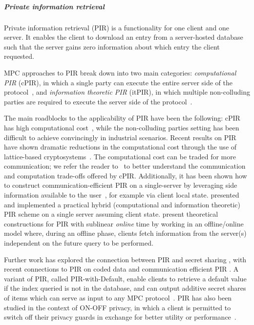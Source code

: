 \documentclass[11pt]{article}
\begin{document}
\subparagraph{Private information retrieval}
Private information retrieval (PIR) is a functionality for one client and one server.  It enables the client to download an entry from a server-hosted database such that the server gains zero information about which entry the client requested.

MPC approaches to PIR break down into two main categories: \textit{computational PIR} (cPIR), in which a single party can execute the entire server side of the protocol~\cite{Kushilevitz97replicationis}, and \textit{information theoretic PIR} (itPIR), in which multiple non-colluding parties are required to execute the server side of the protocol~\cite{Chor98PIR}. 

The main roadblocks to the applicability of PIR have been the following: cPIR has high computational cost~\cite{sion2007computational}, while the non-colluding parties setting has been difficult to achieve convincingly in industrial scenarios. Recent results on PIR have shown dramatic reductions in the computational cost through the use of lattice-based cryptosystems~\cite{aguilar2007lattice,olumofin2011revisiting,aguilar2016xpir,DBLP:conf/sp/AngelCLS18,DBLP:conf/tcc/GentryH19}. The computational cost can be traded for more communication; we refer the reader to~\citet{DBLP:journals/iacr/AliLP0SSY19} to better understand the communication and computation trade-offs offered by cPIR. Additionally, it has been shown how to construct communication-efficient PIR on a single-server by leveraging side information available to the user~\cite{pirsideinfo}, for example via client local state. \citet{Patel18googlePIR} presented and implemented a practical hybrid (computational and information theoretic) PIR scheme on a single server assuming client state. \citet{DBLP:journals/iacr/Corrigan-GibbsK19a} present theoretical constructions for PIR with sublinear \emph{online} time by working in an offline/online model where, during an offline phase, clients fetch information from the server(s) independent on the future query to be performed.

Further work has explored the connection between PIR and secret sharing \cite {yekhaninpir}, with recent connections to PIR on coded data \cite{dolift} and communication efficient PIR \cite{staircasepir}. A variant of PIR, called PIR-with-Default, enable clients to retrieve a default value if the index queried is not in the database, and can output additive secret shares of items which can serve as input to any MPC protocol~\cite{DBLP:journals/iacr/LepointPRST20}. PIR has also been studied in the context of ON-OFF privacy, in which a client is permitted to switch off their privacy guards in exchange for better utility or performance~\cite{onoffisit,onoffitw}. 
\end{document}
